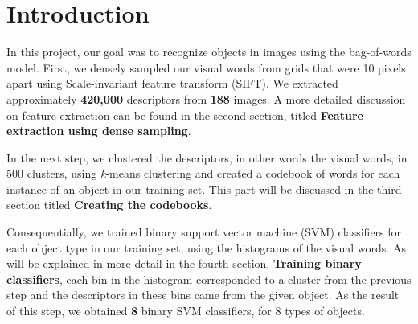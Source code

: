 \documentclass[conference]{IEEEtran}
\newcommand{\secondsection}{Feature extraction using dense sampling}
\newcommand{\thirdsection}{Creating the codebooks}
\newcommand{\fourthsection}{Training binary classifiers}
\begin{document}




\maketitle

\begin{abstract}
Object recognition is a difficult problem and with the rapid growth of image data, it is impossible for objects in images to be manually labeled. In this project, we attempted to detect and classify objects using the bag-of-words method. We used dense sampling to create visual words and kmeans clustering to create a codebook for already labeled objects. And we attempted to classify segments of images in our test set using binary support vector machine classifiers on the basis of their codebooks. \\

\indent Keywords\\
\indent Computer vision, object recognition, bag-of-words
\end{abstract}



\section{Introduction}

In this project, our goal was to recognize objects in images using the bag-of-words model. First, we densely sampled our visual words from grids that were 10 pixels apart using Scale-invariant feature transform (SIFT)\cite{sift}. We extracted approximately \textbf{420,000} descriptors from \textbf{188} images. A more detailed discussion on feature extraction can be found in the second section, titled \textbf{\secondsection}. 

In the next step, we clustered the descriptors, in other words the visual words, in 500 clusters, using \textit{k}-means clustering\cite{kmeans-matlab} and created a codebook of words for each instance of an object in our training set. This part will be discussed in the third section titled \textbf{\thirdsection}. 

Consequentially, we trained binary support vector machine (SVM) classifiers for each object type in our training set, using the histograms of the visual words. As will be explained in more detail in the fourth section, \textbf{\fourthsection}, each bin in the histogram corresponded to a cluster from the previous step and the descriptors in these bins came from the given object. As the result of this step, we obtained \textbf{8} binary SVM classifiers, for 8 types of objects. 
\end{document}
